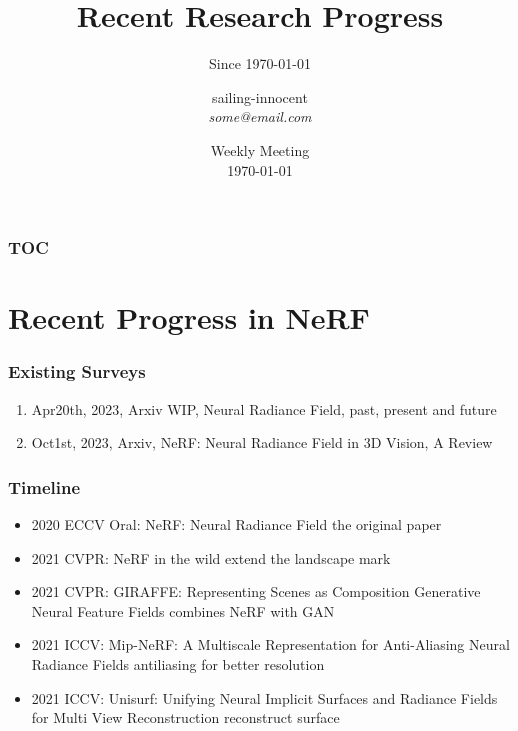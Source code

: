 \documentclass[10pt, hyperref={colorlinks=true,linkcolor=blue},xcolor=dvipsnames]{beamer}
\title[title]{ Recent Research Progress }
\subtitle{Since \today}
\author[SailingInnocent]{\texorpdfstring{sailing-innocent \\ \smallskip \textit{ some@email.com}}{}}
\date[\today]{\texorpdfstring{Weekly Meeting \\ \today}{}}
\begin{document}
\begin{frame}
    \titlepage
\end{frame}

\begin{frame}
    \frametitle{TOC}
    \tableofcontents
\end{frame}

\section{Recent Progress in NeRF}

\begin{frame}
    \frametitle{Existing Surveys}
    \begin{enumerate}
        \item Apr20th, 2023, Arxiv WIP, Neural Radiance Field, past, present and future \cite{mittalNeuralRadianceFields2023}
        \item Oct1st, 2023, Arxiv, NeRF: Neural Radiance Field in 3D Vision, A Review \cite{gaoNeRFNeuralRadiance2022}
    \end{enumerate}
\end{frame}

\begin{frame}
    \frametitle{Timeline}
    \begin{itemize}
        \item 2020 ECCV Oral: NeRF: Neural Radiance Field \cite{mildenhallNeRFRepresentingScenes2020} the original paper
        \item 2021 CVPR: NeRF in the wild \cite{martin-bruallaNeRFWildNeural2021} extend the landscape mark
        \item 2021 CVPR: GIRAFFE: Representing Scenes as Composition Generative Neural Feature Fields\cite{niemeyerGIRAFFERepresentingScenes2021} combines NeRF with GAN
        \item 2021 ICCV: Mip-NeRF: A Multiscale Representation for Anti-Aliasing Neural Radiance Fields\cite{barronMipNeRFMultiscaleRepresentation2021} antiliasing for better resolution
        \item 2021 ICCV: Unisurf: Unifying Neural Implicit Surfaces and Radiance Fields for Multi View Reconstruction \cite{oechsleUNISURFUnifyingNeural2021} reconstruct surface
    \end{itemize}
\end{frame}
\end{document}
